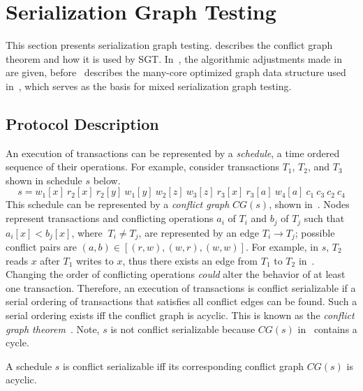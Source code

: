 \section{Serialization Graph Testing}
\label{sec:sgt}

This section presents serialization graph testing. 
 describes the conflict graph theorem and how it is used by SGT.
In~, the algorithmic adjustments
made in~\cite{DBLP:conf/icde/Durner019} are given, before~ describes the 
many-core optimized graph data structure used in~\cite{DBLP:conf/icde/Durner019}, which serves as the basis for mixed serialization graph testing.

\subsection{Protocol Description}
\label{sec:sgt-description}

An execution of transactions can be represented by a \emph{schedule}, a time ordered 
sequence of their operations. For example, consider transactions $T_1$, $T_2$, and $T_3$ shown in
schedule $s$ below.
$$ s = w_1 [x] \ r_2 [x] \ r_2 [y] \ w_1 [y] \ w_2[z] \ w_3[z] \ r_3 [x] \ r_3 [a] \ w_4 [a] \ c_1 \ c_3 \ c_2 \ c_4 $$
This schedule can be represented by a \emph{conflict graph} $CG(s)$, shown in~. 
Nodes represent transactions and conflicting operations $a_i$ of $T_i$ and $b_j$ of $T_j$ such 
that $a_i[x] < b_j[x]$, where $ \ T_i \neq T_j$, are represented by an edge $T_i \rightarrow T_j$;
possible conflict pairs are $(a,b) \in [(r,w),(w,r),(w,w)]$. For example, in $s$, $T_2$ reads $x$ 
after $T_1$ writes to $x$, thus there exists an edge from $T_1$ to $T_2$ in~.
Changing the order of conflicting operations \emph{could} alter the behavior of at least one 
transaction. Therefore, an execution of transactions is conflict serializable if a serial ordering of
transactions that satisfies all conflict edges can be found. Such a serial ordering exists iff the 
conflict graph is acyclic. This is known as the \emph{conflict graph theorem}~\cite{DBLP:books/aw/BernsteinHG87}. 
Note, $s$ is not conflict serializable because $CG(s)$ in~ contains a cycle.

\begin{theorem}
  A schedule $s$ is conflict serializable iff its corresponding conflict graph
  $CG(s)$ is acyclic.
\end{theorem}

